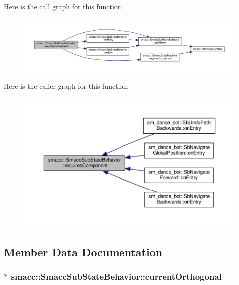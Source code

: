 Here is the call graph for this function\+:
\nopagebreak
\begin{figure}[H]
\begin{center}
\leavevmode
\includegraphics[width=350pt]{classsmacc_1_1SmaccSubStateBehavior_a9f31f62f886cc06017e92fa0d834b12d_cgraph}
\end{center}
\end{figure}




Here is the caller graph for this function\+:
\nopagebreak
\begin{figure}[H]
\begin{center}
\leavevmode
\includegraphics[width=350pt]{classsmacc_1_1SmaccSubStateBehavior_a9f31f62f886cc06017e92fa0d834b12d_icgraph}
\end{center}
\end{figure}




\subsection{Member Data Documentation}
\subsubsection[{\texorpdfstring{current\+Orthogonal}{currentOrthogonal}}]{$\ast$ smacc\+::\+Smacc\+Sub\+State\+Behavior\+::current\+Orthogonal}\hypertarget{classsmacc_1_1SmaccSubStateBehavior_a40aac919bb306d95838fdfcc34cfe391}{}\label{classsmacc_1_1SmaccSubStateBehavior_a40aac919bb306d95838fdfcc34cfe391}


